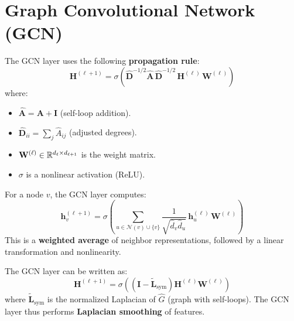 \section{Graph Convolutional Network (GCN)}

\begin{definition}
The GCN layer uses the following \textbf{propagation rule}:
\[
    \mathbf{H}^{(\ell+1)} = \sigma\!\left(\hat{\mathbf{D}}^{-1/2}
    \hat{\mathbf{A}}\, \hat{\mathbf{D}}^{-1/2}\, \mathbf{H}^{(\ell)}\,
    \mathbf{W}^{(\ell)}\right)
\]
where:
\begin{itemize}
    \item $\hat{\mathbf{A}} = \mathbf{A} + \mathbf{I}$ (self-loop addition).
    \item $\hat{\mathbf{D}}_{ii} = \sum_j \hat{A}_{ij}$ (adjusted degrees).
    \item $\mathbf{W}^{(\ell)} \in \mathbb{R}^{d_\ell \times d_{\ell+1}}$ is the weight matrix.
    \item $\sigma$ is a nonlinear activation (ReLU).
\end{itemize}
\end{definition}

\begin{remark}[Interpretation]
For a node $v$, the GCN layer computes:
\[
    \mathbf{h}_v^{(\ell+1)} = \sigma\!\left(\sum_{u \in \mathcal{N}(v) \cup \{v\}}
    \frac{1}{\sqrt{\hat{d}_v \hat{d}_u}}\, \mathbf{h}_u^{(\ell)}\, \mathbf{W}^{(\ell)}\right)
\]
This is a \textbf{weighted average} of neighbor representations, followed by
a linear transformation and nonlinearity.
\end{remark}

\begin{proposition}
The GCN layer can be written as:
\[
    \mathbf{H}^{(\ell+1)} = \sigma\!\left((\mathbf{I} - \tilde{\mathbf{L}}_{\text{sym}})
    \mathbf{H}^{(\ell)} \mathbf{W}^{(\ell)}\right)
\]
where $\tilde{\mathbf{L}}_{\text{sym}}$ is the normalized Laplacian of $\hat{G}$
(graph with self-loops). The GCN layer thus performs \textbf{Laplacian smoothing}
of features.
\end{proposition}

